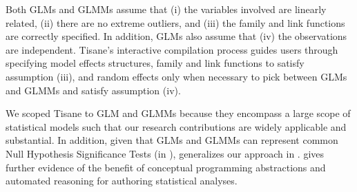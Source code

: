 Both GLMs and GLMMs assume that (i) the variables involved are linearly related,
(ii) there are no extreme outliers, and (iii) the family and link functions are
correctly specified. In addition, GLMs also assume that (iv) the observations
are independent. Tisane's interactive compilation process guides users through
specifying model effects structures, family and link functions to satisfy
assumption (iii), and random effects only when necessary to pick between GLMs
and GLMMs and satisfy assumption (iv).

We scoped Tisane to GLM and GLMMs because they encompass a large scope of
statistical models such that our research contributions are widely applicable
and substantial. In addition, given that GLMs and GLMMs can represent common
Null Hypothesis Significance Tests (in \tea), \tisane generalizes our approach
in \tea. \tisane gives further evidence of the benefit of conceptual programming
abstractions and automated reasoning for authoring statistical analyses.


\begin{comment}
Recent work in the database community helps researchers answer causal questions
about multilevel, or hierarchical, data~\cite{salimi2020causal, kayali2020demonstration}.
CaRL~\cite{salimi2020causal} provides a domain-specific language to express
causal relationships between variables and a GUI to show researchers %
results. \tea and \tisane leverage a similar insight that researchers have domain
knowledge that a system can use to infer statistical methods. Whereas CaRL is
focused on answering specific queries about average causal effect, the systems
in this dissertation are designed to address a range of non-causal questions as well.
\end{comment}